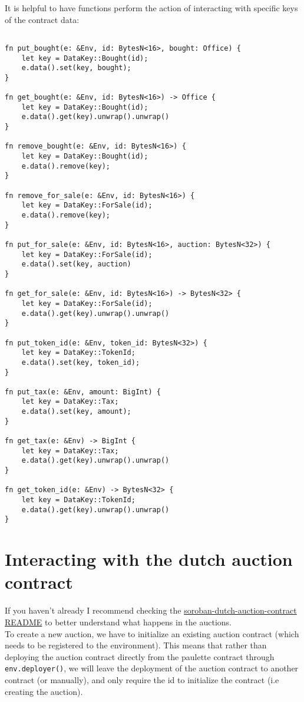 \documentclass[10pt]{article}
\begin{document}
It is helpful to have functions perform the action of interacting with specific keys of the contract data:

\begin{verbatim}

fn put_bought(e: &Env, id: BytesN<16>, bought: Office) {
    let key = DataKey::Bought(id);
    e.data().set(key, bought);
}

fn get_bought(e: &Env, id: BytesN<16>) -> Office {
    let key = DataKey::Bought(id);
    e.data().get(key).unwrap().unwrap()
}

fn remove_bought(e: &Env, id: BytesN<16>) {
    let key = DataKey::Bought(id);
    e.data().remove(key);
}

fn remove_for_sale(e: &Env, id: BytesN<16>) {
    let key = DataKey::ForSale(id);
    e.data().remove(key);
}

fn put_for_sale(e: &Env, id: BytesN<16>, auction: BytesN<32>) {
    let key = DataKey::ForSale(id);
    e.data().set(key, auction)
}

fn get_for_sale(e: &Env, id: BytesN<16>) -> BytesN<32> {
    let key = DataKey::ForSale(id);
    e.data().get(key).unwrap().unwrap()
}

fn put_token_id(e: &Env, token_id: BytesN<32>) {
    let key = DataKey::TokenId;
    e.data().set(key, token_id);
}

fn put_tax(e: &Env, amount: BigInt) {
    let key = DataKey::Tax;
    e.data().set(key, amount);
}

fn get_tax(e: &Env) -> BigInt {
    let key = DataKey::Tax;
    e.data().get(key).unwrap().unwrap()
}

fn get_token_id(e: &Env) -> BytesN<32> {
    let key = DataKey::TokenId;
    e.data().get(key).unwrap().unwrap()
}

\end{verbatim}

\section*{Interacting with the dutch auction contract}
If you haven't already I recommend checking the \href{https://github.com/Xycloo/soroban-dutch-auction-contract}{soroban-dutch-auction-contract README} to better understand what happens in the auctions.\\
To create a new auction, we have to initialize an existing auction contract (which needs to be registered to the environment). This means that rather than deploying the auction contract directly from the paulette contract through \texttt{env.deployer()}, we will leave the deployment of the auction contract to another contract (or manually), and only require the id to initialize the contract (i.e creating the auction).
\end{document}
